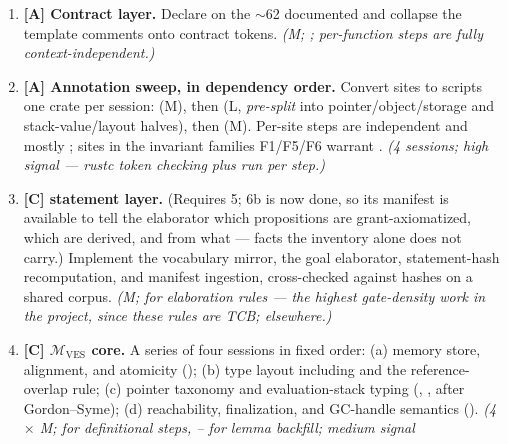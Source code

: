 \begin{enumerate}[leftmargin=2.2em, itemsep=0.35em]
  with the guard off and confirms the citing sites fail to compile ---
  otherwise the mechanism silently degrades to a static premise, which
  is precisely defect (a) of \cref{sec:system-defects} in a new
  costume.  Third, whether to supply the  shadow
  hooks of \cref{sec:dsl-tokens}: the predicates are \dotnetrs{}
  functions, so if they are wanted, the vocabulary needs a shadow field
  and  a hook trait, and this session is where the
  requirement becomes concrete.
\item \textbf{[A] Contract layer.} Declare  on
  the $\sim$62 documented  and collapse the template
  comments onto contract tokens.
  \emph{(M; ; per-function steps are fully
  context-independent.)}
\item \textbf{[A] Annotation sweep, in dependency order.} Convert
  \safetyc{} sites to scripts one crate per session:
   (M), then  (L,
  \emph{pre-split} into pointer/object/storage and
  stack-value/layout halves), then  (M).
  Per-site steps are independent and mostly ; sites in
  the invariant families F1/F5/F6 warrant .
  \emph{(4 sessions; high signal --- rustc token checking plus
   run per step.)}
\item \textbf{[C]  statement layer.} (Requires 5; 6b is
  now done, so its manifest is available to tell the elaborator which
  propositions are grant-axiomatized, which are derived, and from
  what --- facts the  inventory alone does
  not carry.)
  Implement the vocabulary mirror, the goal elaborator, statement-hash
  recomputation, and manifest ingestion, cross-checked against
   hashes on a shared corpus.
  \emph{(M;  for elaboration rules --- the highest
  gate-density work in the project, since these rules are TCB;
   elsewhere.)}
\item \textbf{[C] $\mathcal{M}_{\mathrm{VES}}$ core.} A series of four
  sessions in fixed order: (a) memory store, alignment, and atomicity
  (); (b) type layout including  and the
  reference-overlap rule; (c) pointer taxonomy and evaluation-stack
  typing (, , after Gordon--Syme);
  (d) reachability, finalization, and GC-handle semantics
  ().
  \emph{(4 $\times$ M;  for definitional steps,
  -- for lemma backfill; medium signal
}
\end{enumerate}

